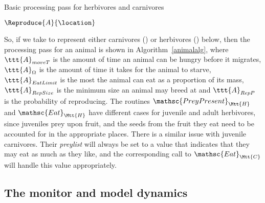 \begin{algorithm}\label{animalalg}
  \caption{Basic processing pass for herbivores and carnivores}
  \begin{algorithmic}
  \State \Die
  \EndIf
  \Else
  $\Reproduce{A}{\location}$
  \EndIf
  \EndIf
\end{algorithmic}
\end{algorithm}

So, if we take  to represent either carnivores () or
herbivores () below, then the processing pass for an animal is
shown in Algorithm~\ref{animalalg}, where $\ttt{A}_{moveT}$ is the
amount of time an animal can be hungry before it migrates,
$\ttt{A}_\Omega$ is the amount of time it takes for the animal to
starve, $\ttt{A}_{EatLimit}$ is the most the animal can eat as a
proportion of its mass, $\ttt{A}_{RepSize}$ is the minimum size an
animal may breed at and $\ttt{A}_{RepP}$ is the probability of
reproducing. The routines $\mathsc{PreyPresent}_{\Mtt{H}}$ and
$\mathsc{Eat}_{\Mtt{H}}$ have different cases for juvenile and adult
herbivores, since juveniles prey upon fruit, and the seeds from the
fruit they eat need to be accounted for in the appropriate places. There is
a similar issue with juvenile carnivores. Their \emph{preylist} will
always be set to a value that indicates that they may eat as much as
they like, and the corresponding call to $\mathsc{Eat}_{\Mtt{C}}$ will
handle this value appropriately.


\subsection{The monitor and model dynamics}
\newcommand{\cst}[1]{\node{\bar{\check{\tau}}}^\Sigma_{#1}} %
\newcommand{\domt}[1]{\node{\check{\tau}}^\Sigma_{#1}} %



